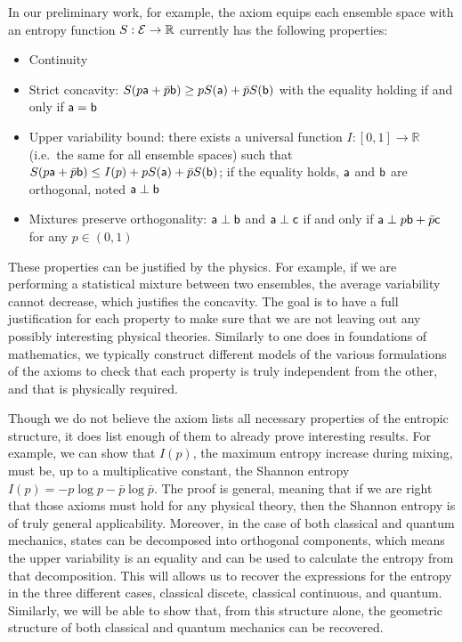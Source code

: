 In our preliminary work, for example, the axiom equips each ensemble space with an entropy function $S : \Ens \to \mathbb{R}$ currently has the following properties:
\begin{itemize}
	\item Continuity
	\item Strict concavity: $S(p\ens[a] + \bar{p} \ens[b]) \geq p S(\ens[a]) + \bar{p} S(\ens[b])$ with the equality holding if and only if $\ens[a] = \ens[b]$
	\item Upper variability bound: there exists a universal function $I : [0,1] \to \mathbb{R}$ (i.e.~the same for all ensemble spaces) such that $S(p\ens[a] + \bar{p} \ens[b]) \leq I(p) + p S(\ens[a]) + \bar{p} S(\ens[b])$; if the equality holds, $\ens[a]$ and $\ens[b]$ are orthogonal, noted $\ens[a] \ortho \ens[b]$
	\item Mixtures preserve orthogonality: $\ens[a] \ortho \ens[b]$ and $\ens[a] \ortho \ens[c]$ if and only if $\ens[a] \ortho p \ens[b] + \bar{p} \ens[c]$ for any $p \in (0,1)$
\end{itemize}
These properties can be justified by the physics. For example, if we are performing a statistical mixture between two ensembles, the average variability cannot decrease, which justifies the concavity. The goal is to have a full justification for each property to make sure that we are not leaving out any possibly interesting physical theories. Similarly to one does in foundations of mathematics, we typically construct different models of the various formulations of the axioms to check that each property is truly independent from the other, and that is physically required.

Though we do not believe the axiom lists all necessary properties of the entropic structure, it does list enough of them to already prove interesting results. For example, we can show that $I(p)$, the maximum entropy increase during mixing, must be, up to a multiplicative constant, the Shannon entropy~\cite{Shannon} $I(p)= - p \log p - \bar{p} \log \bar{p}$. The proof is general, meaning that if we are right that those axioms must hold for any physical theory, then the Shannon entropy is of truly general applicability. Moreover, in the case of both classical and quantum mechanics, states can be decomposed into orthogonal components, which means the upper variability is an equality and can be used to calculate the entropy from that decomposition. This will allows us to recover the expressions for the entropy in the three different cases, classical discete, classical continuous, and quantum. Similarly, we will be able to show that, from this structure alone, the geometric structure of both classical and quantum mechanics can be recovered.

